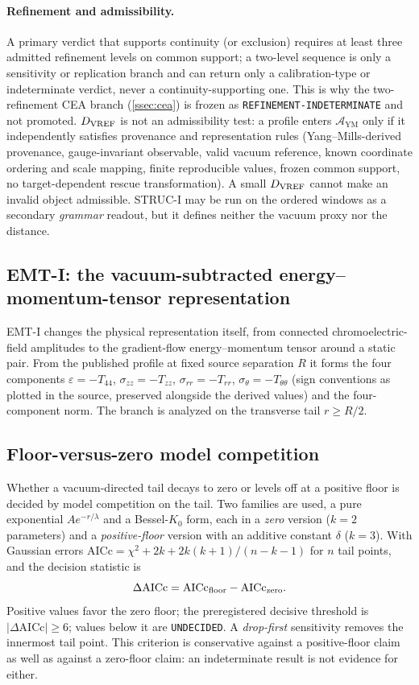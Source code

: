 \documentclass[11pt,a4paper]{article}
\theoremstyle{definition}
\theoremstyle{remark}
\newcommand{\AYM}{\mathcal{A}_{\mathrm{YM}}}
\begin{document}
\paragraph{Refinement and admissibility.} A primary verdict that supports continuity (or exclusion) requires at least three admitted refinement levels on common support; a two-level sequence is only a sensitivity or replication branch and can return only a calibration-type or indeterminate verdict, never a continuity-supporting one. This is why the two-refinement CEA branch (\cref{ssec:cea}) is frozen as \texttt{REFINEMENT-\allowbreak{}INDETERMINATE} and not promoted. $D_{\rm VREF}$ is not an admissibility test: a profile enters $\AYM$ only if it independently satisfies provenance and representation rules (Yang--Mills-derived provenance, gauge-invariant observable, valid vacuum reference, known coordinate ordering and scale mapping, finite reproducible values, frozen common support, no target-dependent rescue transformation). A small $D_{\rm VREF}$ cannot make an invalid object admissible. STRUC-I may be run on the ordered windows as a secondary \emph{grammar} readout, but it defines neither the vacuum proxy nor the distance.

\subsection{EMT-I: the vacuum-subtracted energy--momentum-tensor representation}\label{ssec:emti}
EMT-I changes the physical representation itself, from connected chromoelectric-field amplitudes to the gradient-flow energy--momentum tensor around a static pair. From the published profile at fixed source separation $R$ it forms the four components $\varepsilon=-T_{44}$, $\sigma_{zz}=-T_{zz}$, $\sigma_{rr}=-T_{rr}$, $\sigma_\theta=-T_{\theta\theta}$ (sign conventions as plotted in the source, preserved alongside the derived values) and the four-component norm. The branch is analyzed on the transverse tail $r\ge R/2$.

\subsection{Floor-versus-zero model competition}\label{ssec:aicc}
Whether a vacuum-directed tail decays to zero or levels off at a positive floor is decided by model competition on the tail. Two families are used, a pure exponential $Ae^{-r/\lambda}$ and a Bessel-$K_0$ form, each in a \emph{zero} version ($k=2$ parameters) and a \emph{positive-floor} version with an additive constant $\delta$ ($k=3$). With Gaussian errors $\mathrm{AICc}=\chi^2+2k+2k(k+1)/(n-k-1)$ for $n$ tail points, and the decision statistic is
\begin{equation}
\Delta\mathrm{AICc}=\mathrm{AICc}_{\rm floor}-\mathrm{AICc}_{\rm zero}.
\end{equation}
Positive values favor the zero floor; the preregistered decisive threshold is $|\Delta\mathrm{AICc}|\ge6$; values below it are \texttt{UNDECIDED}. A \emph{drop-first} sensitivity removes the innermost tail point. This criterion is conservative against a positive-floor claim as well as against a zero-floor claim: an indeterminate result is not evidence for either.
\end{document}
